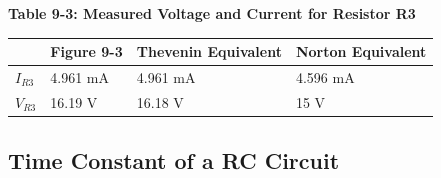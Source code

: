 \documentclass[a4paper]{article}
\begin{document}
\begin{center}
    \small\textbf{Table 9-3: Measured Voltage and Current for Resistor R3}
    \begin{tabular}{|p{3 cm}|p{3 cm}|p{3 cm}|p{3 cm}|}
        \hline
        & Figure 9-3 & Thevenin Equivalent & Norton Equivalent \\
        \hline
        $I_{R3}$ & 4.961 mA & 4.961 mA & 4.596 mA \\
        \hline
        $V_{R3}$ & 16.19 V & 16.18 V & 15 V\\
        \hline
    \end{tabular}
\end{center}

\subsection{Time Constant of a RC Circuit}
\pagebreak
\end{document}
